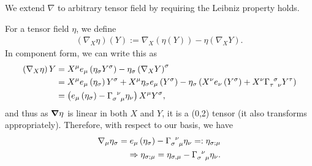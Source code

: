 We extend $\nabla$ to arbitrary tensor field by requiring the Leibniz property holds.
\begin{example}
    For a tensor field $\eta$, we define
    \begin{align}
        \left( \nabla_{X} \eta \right)  \left( Y \right) := \nabla_X \left( \eta \left( Y \right)  \right) - \eta \left( \nabla_X Y \right) 
    .\end{align}
    In component form, we can write this as
    \begin{align}
        \left( \nabla_X \eta \right) Y &= X^{\mu} e_\mu \left( \eta_\sigma Y^{\sigma} \right) - \eta_{\sigma} \left( \nabla_{X} Y \right)^{\sigma} \\
        &= X^{\mu} e_\mu \left( \eta_\sigma \right) Y^{\sigma} + X^{\mu} \eta_\sigma e_\mu \left( Y^{\sigma}\right) - \eta_\sigma \left( X^{\nu} e_\nu \left( Y^{\sigma}   \right) + X^{\nu} \tensor{\Gamma}{_{\tau}^{\sigma}_{\nu}} Y^{\tau} \right)  \\
        &= \left( e_{\mu} \left( \eta_{\sigma} \right) - \tensor{\Gamma}{_{\sigma}^{\nu}_{\mu}} \eta_{\nu} \right) X^{\mu} Y^{\sigma}
    ,\end{align}
    and thus as $\grad \eta$ is linear in both $X$ and $Y$, it is a (0,2) tensor (it also transforms appropriately).
    Therefore, with respect to our basis, we have
    \begin{align}
        \nabla_\mu \eta_\sigma = e_\mu \left( \eta_\sigma \right)  - \tensor{\Gamma}{_{\sigma}^{\nu}_\mu} \eta_\nu =: \eta_{\sigma ; \mu} \\
        \implies \eta_{\sigma ; \mu} = \eta_{\sigma , \mu} - \tensor{\Gamma}{_{\sigma}^{\nu}_\mu} \eta_\nu
    .\end{align}
\end{example}







